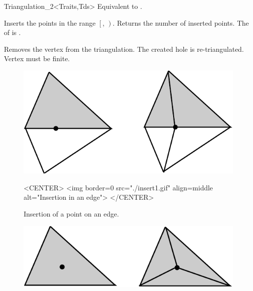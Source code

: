 \begin{ccRefClass}{Triangulation_2<Traits,Tds>}
{Equivalent to .}

{Inserts the points in the range
 $\left[\right.$, $\left.\right)$.
 Returns the number of inserted points.
 \ccPrecond The  of 
 is .}

{Removes the vertex from the triangulation. The created hole is 
 re-triangulated.
 \ccPrecond Vertex  must be finite.}


\begin{figure}
\begin{ccTexOnly}
\begin{center}
\includegraphics{Triangulation_2/insert1}
\end{center}
\end{ccTexOnly}


\begin{ccHtmlOnly}
<CENTER>
<img border=0 src="./insert1.gif" align=middle alt="Insertion in an edge">
</CENTER>
\end{ccHtmlOnly}

\caption{Insertion of a point on an edge.
\label{Triangulation_ref_Fig_inser1t}}
\end{figure}




\begin{figure}
\begin{ccTexOnly}
\begin{center}
\includegraphics{Triangulation_2/insert2}
\end{center}
\end{ccTexOnly}


\end{figure}
\end{ccRefClass}
